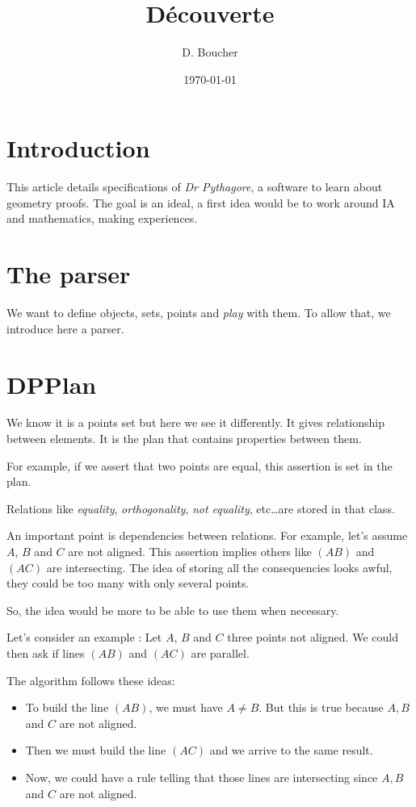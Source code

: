 \documentclass[a4paper]{article}
\title{Découverte}
\author{D. Boucher}
\date\today
\begin{document}
\tableofcontents
\newpage

\section{Introduction}

This article details specifications of \textit{Dr Pythagore}, a software to learn about geometry proofs. The goal is an ideal, a first idea would be to work around IA and mathematics, making experiences.

\section{The parser}

We want to define objects, sets, points and \textit{play} with them. To allow that, we introduce here a parser.

\section{DPPlan}

We know it is a points set but here we see it differently. It gives relationship between elements. It is the plan that contains properties between them.

For example, if we assert that two points are equal, this assertion is set in the plan.

Relations like \textit{equality}, \textit{orthogonality}, \textit{not equality}, etc\dots are stored in that class.

An important point is dependencies between relations. For example, let's assume $A$, $B$ and $C$ are not aligned. This assertion implies others like $(AB)$ and $(AC)$ are intersecting. The idea of storing all the consequencies looks awful, they could be too many with only several points.

So, the idea would be more to be able to use them when necessary.

Let's consider an example : Let $A$, $B$ and $C$ three points not aligned.
We could then ask if lines $(AB)$ and $(AC)$ are parallel.

The algorithm follows these ideas:
\begin{itemize}
\item To build the line $(AB)$, we must have $A\neq B$. But this is true because $A, B$ and $C$ are not aligned.
\item Then we must build the line $(AC)$ and we arrive to the same result.
\item Now, we could have a rule telling that those lines are intersecting since $A,B$ and $C$ are not aligned.
\end{itemize}
\end{document}
